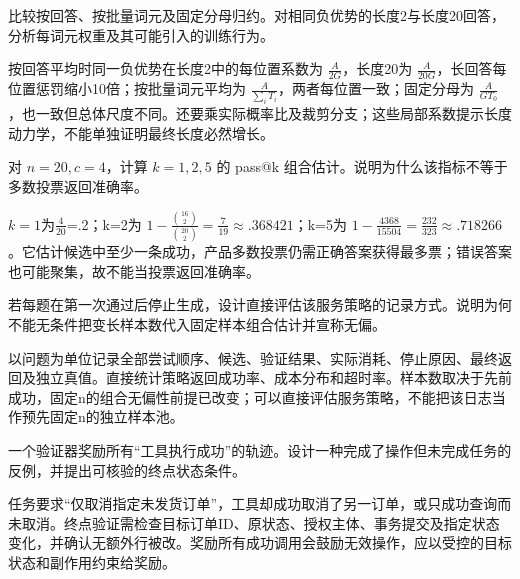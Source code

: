 \begin{exercises}
\begin{exercise} 比较按回答、按批量词元及固定分母归约。对相同负优势的长度2与长度20回答，分析每词元权重及其可能引入的训练行为。

\begin{solution}
按回答平均时同一负优势在长度2中的每位置系数为 $\frac{A}{2G}$，长度20为 $\frac{A}{20G}$，长回答每位置惩罚缩小10倍；按批量词元平均为 $\frac{A}{\sum_iT_i}$，两者每位置一致；固定分母为 $\frac{A}{GT_0}$，也一致但总体尺度不同。还要乘实际概率比及裁剪分支；这些局部系数提示长度动力学，不能单独证明最终长度必然增长。
\end{solution}
\end{exercise}

\begin{exercise} 对 $n=20,c=4$，计算 $k=1,2,5$ 的 pass@k 组合估计。说明为什么该指标不等于多数投票返回准确率。

\begin{solution}
$k=1$为$\frac{4}{20}$=.2；k=2为 $1-\frac{\binom{16}2}{\binom{20}2}=\frac{7}{19}\approx.368421$；k=5为 $1-\frac{4368}{15504}=\frac{232}{323}\approx.718266$。它估计候选中至少一条成功，产品多数投票仍需正确答案获得最多票；错误答案也可能聚集，故不能当投票返回准确率。
\end{solution}
\end{exercise}

\begin{exercise}\optional 若每题在第一次通过后停止生成，设计直接评估该服务策略的记录方式。说明为何不能无条件把变长样本数代入固定样本组合估计并宣称无偏。

\begin{solution}
以问题为单位记录全部尝试顺序、候选、验证结果、实际消耗、停止原因、最终返回及独立真值。直接统计策略返回成功率、成本分布和超时率。样本数取决于先前成功，固定n的组合无偏性前提已改变；可以直接评估服务策略，不能把该日志当作预先固定n的独立样本池。
\end{solution}
\end{exercise}

\begin{exercise}\optional 一个验证器奖励所有“工具执行成功”的轨迹。设计一种完成了操作但未完成任务的反例，并提出可核验的终点状态条件。

\begin{solution}
任务要求“仅取消指定未发货订单”，工具却成功取消了另一订单，或只成功查询而未取消。终点验证需检查目标订单ID、原状态、授权主体、事务提交及指定状态变化，并确认无额外行被改。奖励所有成功调用会鼓励无效操作，应以受控的目标状态和副作用约束给奖励。
\end{solution}
\end{exercise}


\end{exercises}
